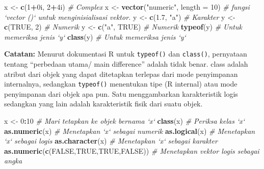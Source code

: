 \documentclass[
]{book}
\newenvironment{Shaded}{\begin{snugshade}}{\end{snugshade}}
\newcommand{\CommentTok}[1]{\textcolor[rgb]{0.56,0.35,0.01}{\textit{#1}}}
\newcommand{\DataTypeTok}[1]{\textcolor[rgb]{0.13,0.29,0.53}{#1}}
\newcommand{\DecValTok}[1]{\textcolor[rgb]{0.00,0.00,0.81}{#1}}
\newcommand{\FloatTok}[1]{\textcolor[rgb]{0.00,0.00,0.81}{#1}}
\newcommand{\KeywordTok}[1]{\textcolor[rgb]{0.13,0.29,0.53}{\textbf{#1}}}
\newcommand{\NormalTok}[1]{#1}
\newcommand{\OperatorTok}[1]{\textcolor[rgb]{0.81,0.36,0.00}{\textbf{#1}}}
\newcommand{\OtherTok}[1]{\textcolor[rgb]{0.56,0.35,0.01}{#1}}
\newcommand{\StringTok}[1]{\textcolor[rgb]{0.31,0.60,0.02}{#1}}
\begin{document}
\begin{Shaded}
\begin{Highlighting}[]
\NormalTok{x <-}\StringTok{ }\KeywordTok{c}\NormalTok{(}\DecValTok{1}\OperatorTok{+}\NormalTok{0i, }\DecValTok{2}\OperatorTok{+}\NormalTok{4i)                     			}\CommentTok{# Complex}
\NormalTok{x <-}\StringTok{ }\KeywordTok{vector}\NormalTok{(}\StringTok{"numeric"}\NormalTok{, }\DataTypeTok{length =} \DecValTok{10}\NormalTok{)    		  }\CommentTok{# fungsi `vector ()` untuk menginisialisasi vektor.}
\NormalTok{y <-}\StringTok{ }\KeywordTok{c}\NormalTok{(}\FloatTok{1.7}\NormalTok{, }\StringTok{"a"}\NormalTok{)                      			}\CommentTok{# Karakter}
\NormalTok{y <-}\StringTok{ }\KeywordTok{c}\NormalTok{(}\OtherTok{TRUE}\NormalTok{, }\DecValTok{2}\NormalTok{)                     			  }\CommentTok{# Numerik}
\NormalTok{y <-}\StringTok{ }\KeywordTok{c}\NormalTok{(}\StringTok{"a"}\NormalTok{, }\OtherTok{TRUE}\NormalTok{)                      			}\CommentTok{# Numerik}
\KeywordTok{typeof}\NormalTok{(y)                              			}\CommentTok{# Untuk memeriksa jenis `y`}
\KeywordTok{class}\NormalTok{(y)                               			}\CommentTok{# Untuk memeriksa jenis `y`}
\end{Highlighting}
\end{Shaded}

\textbf{Catatan:} Menurut dokumentasi R untuk \texttt{typeof()} dan \texttt{class()}, pernyataan tentang ``perbedaan utama/ main difference'' adalah tidak benar. class adalah atribut dari objek yang dapat ditetapkan terlepas dari mode penyimpanan internalnya, sedangkan \texttt{typeof()} menentukan tipe (R internal) atau mode penyimpanan dari objek apa pun. Satu menggambarkan karakteristik logis sedangkan yang lain adalah karakteristik fisik dari suatu objek.

\begin{Shaded}
\begin{Highlighting}[]
\NormalTok{x <-}\StringTok{ }\DecValTok{0}\OperatorTok{:}\DecValTok{10}                              	   \CommentTok{# Mari tetapkan ke objek bernama `x`}
\KeywordTok{class}\NormalTok{(x)                               	   }\CommentTok{# Periksa kelas `x`}
\KeywordTok{as.numeric}\NormalTok{(x)                       	     }\CommentTok{# Menetapkan `x` sebagai numerik}
\KeywordTok{as.logical}\NormalTok{(x)                          	   }\CommentTok{# Menetapkan `x` sebagai logis}
\KeywordTok{as.character}\NormalTok{(x)                        	   }\CommentTok{# Menetapkan `x` sebagai karakter}
\KeywordTok{as.numeric}\NormalTok{(}\KeywordTok{c}\NormalTok{(}\OtherTok{FALSE}\NormalTok{,}\OtherTok{TRUE}\NormalTok{,}\OtherTok{TRUE}\NormalTok{,}\OtherTok{FALSE}\NormalTok{))       }\CommentTok{# Menetapkan vektor logis sebagai angka }
\end{Highlighting}
\end{Shaded}
\end{document}
